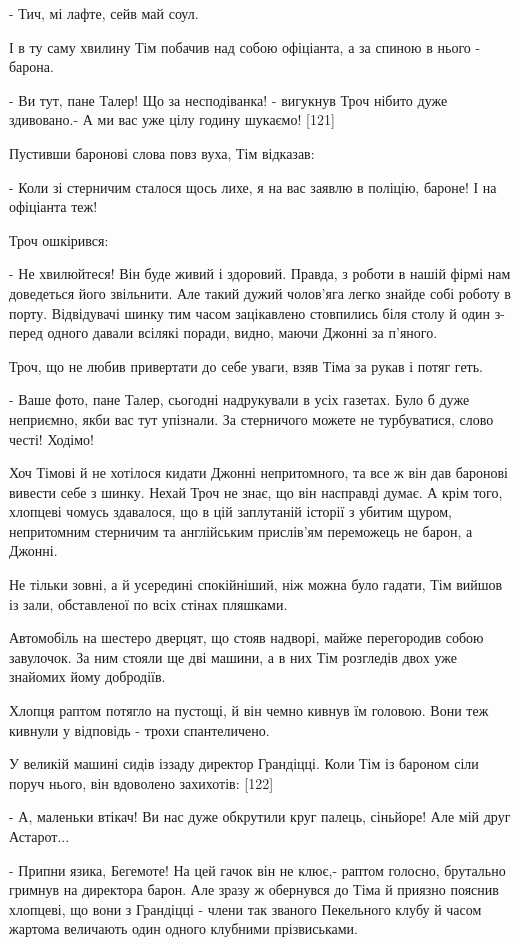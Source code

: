- Тич, мі лафте, сейв май соул.

І в ту саму хвилину Тім побачив над собою офіціанта, а за спиною в нього - барона.

- Ви тут, пане Талер! Що за несподіванка! - вигукнув Троч нібито дуже здивовано.- А ми вас уже цілу годину шукаємо! [121]

Пустивши баронові слова повз вуха, Тім відказав:

- Коли зі стерничим сталося щось лихе, я на вас заявлю в поліцію, бароне! І на офіціанта теж!

Троч ошкірився:

- Не хвилюйтеся! Він буде живий і здоровий. Правда, з роботи в нашій фірмі нам доведеться його звільнити. Але такий дужий чолов'яга легко знайде собі роботу в порту. Відвідувачі шинку тим часом зацікавлено стовпились біля столу й один з-перед одного давали всілякі поради, видно, маючи Джонні за п'яного.

Троч, що не любив привертати до себе уваги, взяв Тіма за рукав і потяг геть.

- Ваше фото, пане Талер, сьогодні надрукували в усіх газетах. Було б дуже неприємно, якби вас тут упізнали. За стерничого можете не турбуватися, слово честі! Ходімо!

Хоч Тімові й не хотілося кидати Джонні непритомного, та все ж він дав баронові вивести себе з шинку. Нехай Троч не знає, що він насправді думає. А крім того, хлопцеві чомусь здавалося, що в цій заплутаній історії з убитим щуром, непритомним стерничим та англійським прислів'ям переможець не барон, а Джонні.

Не тільки зовні, а й усередині спокійніший, ніж можна було гадати, Тім вийшов із зали, обставленої по всіх стінах пляшками.

Автомобіль на шестеро дверцят, що стояв надворі, майже перегородив собою завулочок. За ним стояли ще дві машини, а в них Тім розгледів двох уже знайомих йому добродіїв.

Хлопця раптом потягло на пустощі, й він чемно кивнув їм головою. Вони теж кивнули у відповідь - трохи спантеличено.

У великій машині сидів іззаду директор Грандіцці. Коли Тім із бароном сіли поруч нього, він вдоволено захихотів: [122]

- А, маленьки втікач! Ви нас дуже обкрутили круг палець, сіньйоре! Але мій друг Астарот...

- Припни язика, Бегемоте! На цей гачок він не клює,- раптом голосно, брутально гримнув на директора барон. Але зразу ж обернувся до Тіма й приязно пояснив хлопцеві, що вони з Грандіцці - члени так званого Пекельного клубу й часом жартома величають один одного клубними прізвиськами.

